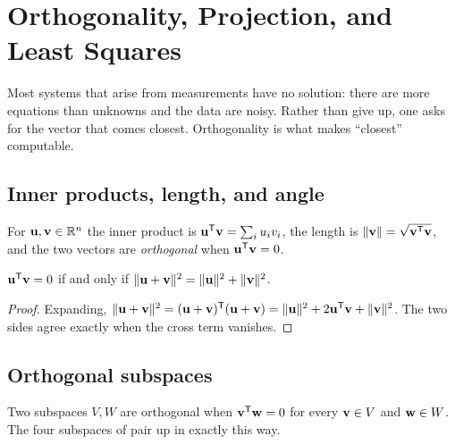\setchapterpreamble[u]{\margintoc}
\chapter{Orthogonality, Projection, and Least Squares}


Most systems that arise from measurements have no solution: there are more
equations than unknowns and the data are noisy. Rather than give up, one asks
for the vector that comes closest. Orthogonality is what makes ``closest''
computable.

\section{Inner products, length, and angle}

For \(\mathbf{u},\mathbf{v}\in\mathbb{R}^{n}\) the inner product is
\(\mathbf{u}^{\mathsf{T}}\mathbf{v}=\sum_i u_iv_i\), the length is
\(\lVert\mathbf{v}\rVert=\sqrt{\mathbf{v}^{\mathsf{T}}\mathbf{v}}\), and the two vectors are
\emph{orthogonal} when \(\mathbf{u}^{\mathsf{T}}\mathbf{v}=0\).

\begin{proposition}
\(\mathbf{u}^{\mathsf{T}}\mathbf{v}=0\) if and only if
\(\lVert\mathbf{u}+\mathbf{v}\rVert^{2}=\lVert\mathbf{u}\rVert^{2}+\lVert\mathbf{v}\rVert^{2}\).
\end{proposition}

\begin{proof}
Expanding,
\(\lVert\mathbf{u}+\mathbf{v}\rVert^{2}
=(\mathbf{u}+\mathbf{v})^{\mathsf{T}}(\mathbf{u}+\mathbf{v})
=\lVert\mathbf{u}\rVert^{2}+2\mathbf{u}^{\mathsf{T}}\mathbf{v}+\lVert\mathbf{v}\rVert^{2}\).
The two sides agree exactly when the cross term vanishes.
\end{proof}


\section{Orthogonal subspaces}

Two subspaces \(V,W\) are orthogonal when \(\mathbf{v}^{\mathsf{T}}\mathbf{w}=0\) for every
\(\mathbf{v}\in V\) and \(\mathbf{w}\in W\). The four subspaces of
 pair up in exactly this way.

